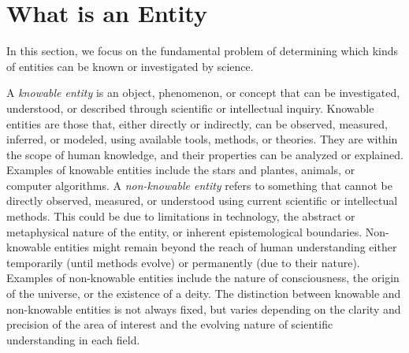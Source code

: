 %
%

\section{What is an Entity}
\label{sec:what-is-an-entity}

In this section, we focus on the fundamental problem of determining which kinds of entities can be known or investigated by science.

A \emph{knowable entity} is an object, phenomenon, or concept that can be investigated, understood, or described through scientific or intellectual inquiry. Knowable entities are those that, either directly or indirectly, can be observed, measured, inferred, or modeled, using available tools, methods, or theories. They are within the scope of human knowledge, and their properties can be analyzed or explained. Examples of knowable entities include the stars and plantes, animals, or computer algorithms. A \emph{non-knowable entity} refers to something that cannot be directly observed, measured, or understood using current scientific or intellectual methods. This could be due to limitations in technology, the abstract or metaphysical nature of the entity, or inherent epistemological boundaries. Non-knowable entities might remain beyond the reach of human understanding either temporarily (until methods evolve) or permanently (due to their nature). Examples of non-knowable entities include the nature of consciousness, the origin of the universe, or the existence of a deity. The distinction between knowable and non-knowable entities is not always fixed, but varies depending on the clarity and precision of the area of interest and the evolving nature of scientific understanding in each field.


